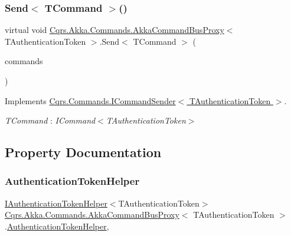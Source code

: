 \subsubsection{\texorpdfstring{Send$<$ T\+Command $>$()}{Send< TCommand >()}\hspace{0.1cm}{\footnotesize\ttfamily [2/2]}}
{\footnotesize\ttfamily virtual void \hyperlink{classCqrs_1_1Akka_1_1Commands_1_1AkkaCommandBusProxy}{Cqrs.\+Akka.\+Commands.\+Akka\+Command\+Bus\+Proxy}$<$ T\+Authentication\+Token $>$.Send$<$ T\+Command $>$ (\begin{DoxyParamCaption}\item[{I\+Enumerable$<$ T\+Command $>$}]{commands }\end{DoxyParamCaption})\hspace{0.3cm}{\ttfamily [virtual]}}



Implements \hyperlink{interfaceCqrs_1_1Commands_1_1ICommandSender_a3fb3ec40a3e862f721a7c9204e67e832_a3fb3ec40a3e862f721a7c9204e67e832}{Cqrs.\+Commands.\+I\+Command\+Sender$<$ T\+Authentication\+Token $>$}.

\begin{Desc}
\item[Type Constraints]\begin{description}
\item[{\em T\+Command} : {\em I\+Command$<$T\+Authentication\+Token$>$}]\end{description}
\end{Desc}


\subsection{Property Documentation}
\mbox{\label{classCqrs_1_1Akka_1_1Commands_1_1AkkaCommandBusProxy_a6faae6227f1da33928e54a775466f9c9_a6faae6227f1da33928e54a775466f9c9}} 
\subsubsection{\texorpdfstring{Authentication\+Token\+Helper}{AuthenticationTokenHelper}}
{\footnotesize\ttfamily \hyperlink{interfaceCqrs_1_1Authentication_1_1IAuthenticationTokenHelper}{I\+Authentication\+Token\+Helper}$<$T\+Authentication\+Token$>$ \hyperlink{classCqrs_1_1Akka_1_1Commands_1_1AkkaCommandBusProxy}{Cqrs.\+Akka.\+Commands.\+Akka\+Command\+Bus\+Proxy}$<$ T\+Authentication\+Token $>$.\hyperlink{classCqrs_1_1Authentication_1_1AuthenticationTokenHelper}{Authentication\+Token\+Helper}\hspace{0.3cm}{\ttfamily [get]}, {\ttfamily [protected]}}

